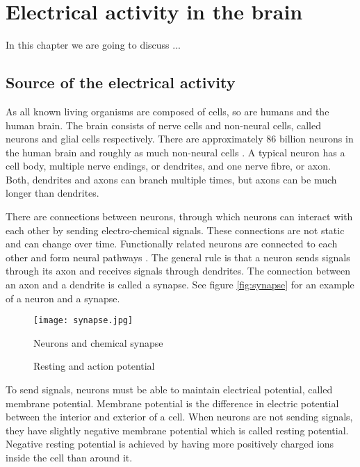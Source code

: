 
\chapter{Electrical activity in the brain}

In this chapter we are going to discuss ...

\section{Source of the electrical activity}
\label{sec:neuron}

As all known living organisms are composed of cells, so are humans and the human brain. The brain consists of nerve cells and non-neural cells, called neurons and glial cells respectively. There are approximately 86 billion neurons in the human brain and roughly as much non-neural cells \cite{neuroncount}. A typical neuron has a cell body, multiple nerve endings, or dendrites, and one nerve fibre, or axon. Both, dendrites and axons can branch multiple times, but axons can be much longer than dendrites. 

There are connections between neurons, through which neurons can interact with each other by sending electro-chemical signals. These connections are not static and can change over time. Functionally related neurons are connected to each other and form neural pathways \cite{neuralpathway}. The general rule is that a neuron sends signals through its axon and receives signals through dendrites. The connection between an axon and a dendrite is called a synapse. See figure \ref{fig:synapse} for an example of a neuron and a synapse.

\begin{figure}[b!]
	\begin{minipage}{0.5\textwidth}
		\centering
		\texttt{[image: synapse.jpg]}
		\caption{Neurons and chemical synapse \cite[p.~17]{neuronpic}}
		\label{fig:synapse}
	\end{minipage}
	\begin{minipage}{0.5\textwidth}
		\centering
		\caption{Resting and action potential}
		\label{fig:action_potential}
	\end{minipage}
\end{figure}

To send signals, neurons must be able to maintain electrical potential, called membrane potential. Membrane potential is the difference in electric potential between the interior and exterior of a cell. When neurons are not sending signals, they have slightly negative membrane potential which is called resting potential. Negative resting potential is achieved by having more positively charged ions inside the cell than around it.

